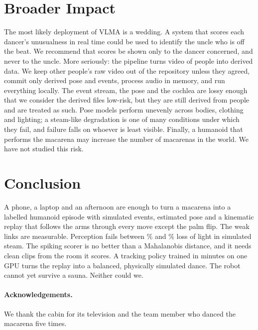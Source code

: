 \documentclass[10pt]{article}
\newcommand{\vlma}{\textsc{VLMA}}
\begin{document}
\section{Broader Impact}
\label{sec:impact}

The most likely deployment of \vlma{} is a wedding. A system that scores each dancer's unusualness in real time could be used to identify the uncle who is off the beat. We recommend that scores be shown only to the dancer concerned, and never to the uncle. More seriously: the pipeline turns video of people into derived data. We keep other people's raw video out of the repository unless they agreed, commit only derived pose and events, process audio in memory, and run everything locally. The event stream, the pose and the cochlea are lossy enough that we consider the derived files low-risk, but they are still derived from people and are treated as such. Pose models perform unevenly across bodies, clothing and lighting; a steam-like degradation is one of many conditions under which they fail, and failure falls on whoever is least visible. Finally, a humanoid that performs the macarena may increase the number of macarenas in the world. We have not studied this risk.

\section{Conclusion}
\label{sec:conclusion}

A phone, a laptop and an afternoon are enough to turn a macarena into a labelled humanoid episode with simulated events, estimated pose and a kinematic replay that follows the arms through every move except the palm flip. The weak links are measurable. Perception fails between \LossSThirty\% and \LossSForty\% loss of light in simulated steam. The spiking scorer is no better than a Mahalanobis distance, and it needs clean clips from the room it scores. A tracking policy trained in minutes on one GPU turns the replay into a balanced, physically simulated dance. The robot cannot yet survive a sauna. Neither could we.

\paragraph{Acknowledgements.} We thank the cabin for its television and the team member who danced the macarena five times.

{\small


}
\end{document}
